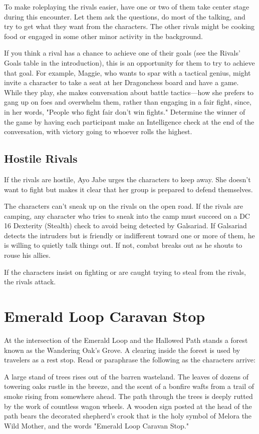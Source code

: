 \documentclass[10pt,a4paper,twoside,fancy,bg=print,twocolumn,openany,nodeprecatedcode]{dndbook}
\begin{document}
To make roleplaying the rivals easier, have one or two of them take center stage during this encounter. Let them ask the questions, do most of the talking, and try to get what they want from the characters. The other rivals might be cooking food or engaged in some other minor activity in the background.

If you think a rival has a chance to achieve one of their goals (see the Rivals' Goals table in the introduction), this is an opportunity for them to try to achieve that goal. For example, Maggie, who wants to spar with a tactical genius, might invite a character to take a seat at her Dragonchess board and have a game. While they play, she makes conversation about battle tactics—how she prefers to gang up on foes and overwhelm them, rather than engaging in a fair fight, since, in her words, "People who fight fair don't win fights." Determine the winner of the game by having each participant make an Intelligence check at the end of the conversation, with victory going to whoever rolls the highest.

\subsection{Hostile Rivals}
If the rivals are hostile, Ayo Jabe urges the characters to keep away. She doesn't want to fight but makes it clear that her group is prepared to defend themselves.

The characters can't sneak up on the rivals on the open road. If the rivals are camping, any character who tries to sneak into the camp must succeed on a DC 16 Dexterity (Stealth) check to avoid being detected by Galsariad. If Galsariad detects the intruders but is friendly or indifferent toward one or more of them, he is willing to quietly talk things out. If not, combat breaks out as he shouts to rouse his allies.

If the characters insist on fighting or are caught trying to steal from the rivals, the rivals attack.

\section{Emerald Loop Caravan Stop}
At the intersection of the Emerald Loop and the Hallowed Path stands a forest known as the Wandering Oak's Grove. A clearing inside the forest is used by travelers as a rest stop. Read or paraphrase the following as the characters arrive:

\begin{DndReadAloud}{}
A large stand of trees rises out of the barren wasteland. The leaves of dozens of towering oaks rustle in the breeze, and the scent of a bonfire wafts from a trail of smoke rising from somewhere ahead. The path through the trees is deeply rutted by the work of countless wagon wheels. A wooden sign posted at the head of the path bears the decorated shepherd's crook that is the holy symbol of Melora the Wild Mother, and the words "Emerald Loop Caravan Stop."

\end{DndReadAloud}
\end{document}

